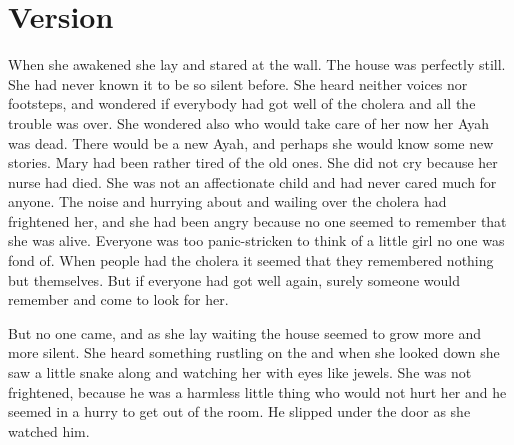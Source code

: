 \documentclass{fiche}
\begin{document}
\section{Version}

\begin{version}
When she awakened she lay and stared at the wall. The house was perfectly still. She had
never known it to be so silent before. She heard neither voices nor footsteps, and wondered
if everybody had got well of the cholera and all the trouble was over. She wondered also who
would take care of her now her Ayah was dead. There would be a new Ayah, and perhaps she
would know some new stories. Mary had been rather tired of the old ones. She did not cry
because her nurse had died. She was not an affectionate child and had never cared much for
anyone. The noise and hurrying about and wailing over the cholera had frightened her, and she
had been angry because no one seemed to remember that she was alive. Everyone was too
panic-stricken to think of a little girl no one was fond of. When people had the cholera it
seemed that they remembered nothing but themselves. But if everyone had got well again,
surely someone would remember and come to look for her.

But no one came, and as she lay waiting the house seemed to grow more and more silent. She
heard something rustling on the  and when she looked
down she saw a little snake  along and watching her
with eyes like jewels. She was not frightened, because he was a harmless little thing who
would not hurt her and he seemed in a hurry to get out of the room. He slipped under the door
as she watched him.
\end{version}

\end{document}
